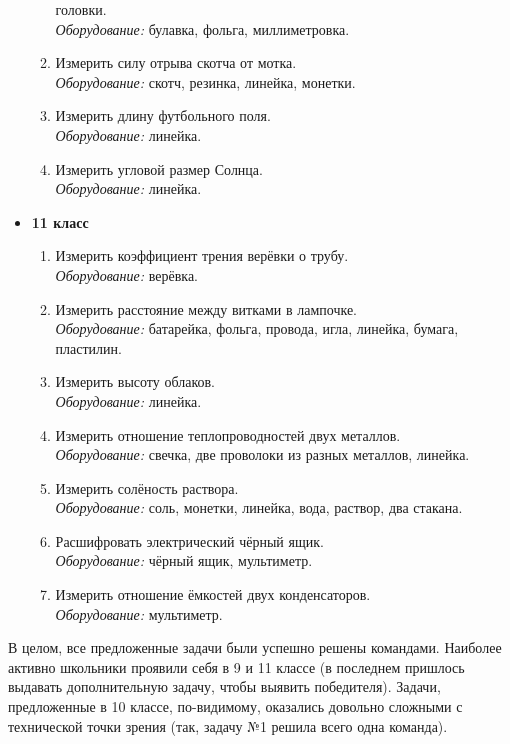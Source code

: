 \documentclass[12pt,a4paper,oneside,draft]{scrartcl}
\begin{document}
\begin{itemize}
\begin{enumerate}
    головки. \\
    \textit{Оборудование:} булавка, фольга, миллиметровка.
  \item Измерить силу отрыва скотча от мотка. \\
    \textit{Оборудование:} скотч, резинка, линейка, монетки.
  \item Измерить длину футбольного поля. \\
    \textit{Оборудование:} линейка.
  \item Измерить угловой размер Солнца. \\
    \textit{Оборудование:} линейка. 
  \end{enumerate}
\item \textbf{11 класс}
  \begin{enumerate}
  \item Измерить коэффициент трения верёвки о трубу. \\
    \textit{Оборудование:} верёвка.
  \item Измерить расстояние между витками в лампочке.\\
    \textit{Оборудование:} батарейка, фольга, провода, игла, линейка,
    бумага, пластилин.
  \item Измерить высоту облаков. \\
    \textit{Оборудование:} линейка.
  \item Измерить отношение теплопроводностей двух металлов. \\
    \textit{Оборудование:} свечка, две проволоки из разных металлов,
    линейка.
  \item Измерить солёность раствора. \\
    \textit{Оборудование:} соль, монетки, линейка, вода, раствор, два
    стакана.
  \item Расшифровать электрический чёрный ящик. \\
    \textit{Оборудование:} чёрный ящик, мультиметр.
  \item Измерить отношение ёмкостей двух конденсаторов. \\
    \textit{Оборудование:} мультиметр. 
  \end{enumerate}
\end{itemize}

В целом, все предложенные задачи были успешно решены
командами. Наиболее активно школьники проявили себя в 9 и 11 классе (в
последнем пришлось выдавать дополнительную задачу, чтобы выявить
победителя). Задачи, предложенные в 10 классе, по-видимому, оказались
довольно сложными с технической точки зрения (так, задачу №1 решила
всего одна команда). 
\end{document}
